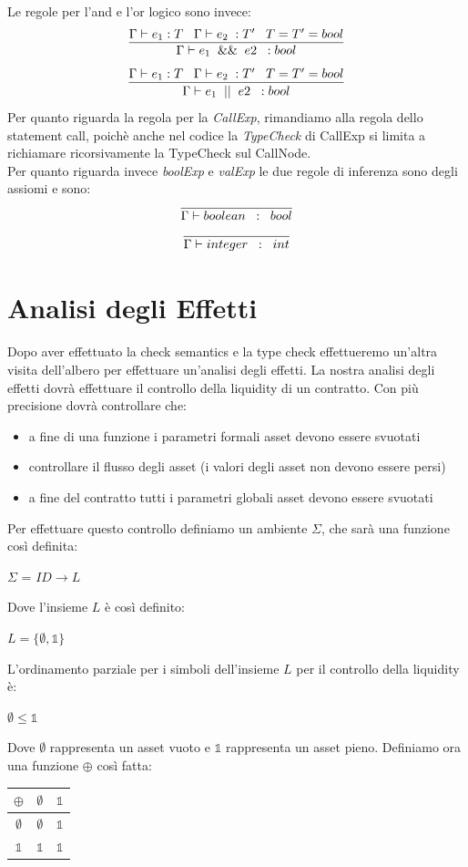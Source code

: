 \documentclass[12pt, a4paper]{report}
\begin{document}
Le regole per l'and e l'or logico sono invece:
\[ \infer{\Gamma \vdash e_1\;\; \&\&\;\; e2 \;\; : bool}{\Gamma \vdash e_1 :T \;\;\; \Gamma \vdash e_2 \; : T' \;\;\; T=T'=bool} \]
\[ \infer{\Gamma \vdash e_1 \;\; ||\;\; e2 \;\; : bool}{\Gamma \vdash e_1 :T \;\;\; \Gamma \vdash e_2 \; : T' \;\;\; T=T'=bool} \]
Per quanto riguarda la regola per la \emph{CallExp}, rimandiamo alla regola dello statement call, poichè anche nel codice la \emph{TypeCheck} di CallExp si limita a richiamare ricorsivamente la TypeCheck sul CallNode.\\
Per quanto riguarda invece \emph{boolExp} e \emph{valExp} le due regole di inferenza sono degli assiomi e sono:
\[ \infer{\Gamma \vdash boolean \;\; : \;\; bool}{} \]
\[ \infer{\Gamma \vdash integer \;\; : \;\; int}{} \]
\chapter{Analisi degli Effetti}
Dopo aver effettuato la check semantics e la type check effettueremo un'altra visita dell'albero per effettuare un'analisi degli effetti. La nostra analisi degli effetti dovrà effettuare il controllo della liquidity di un contratto. Con più precisione dovrà controllare che:
\begin{itemize}
    \item a fine di una funzione i parametri formali asset devono essere svuotati
    \item controllare il flusso degli asset (i valori degli asset non devono essere persi)
    \item a fine del contratto tutti i parametri globali asset devono essere svuotati 
\end{itemize}
Per effettuare questo controllo definiamo un ambiente $\Sigma$, che sarà una funzione così definita:
\begin{center}
    $\Sigma$ = $ID \rightarrow L$
\end{center}
Dove l'insieme $L$ è così definito:
\begin{center}
    $L = \{\emptyset, \mathds{1}\}$
\end{center}
L'ordinamento parziale per i simboli dell'insieme $L$ per il controllo della liquidity è: 
\begin{center}
    $ \emptyset \leq  \mathds{1}$
\end{center} 
Dove $\emptyset$ rappresenta un asset vuoto e $ \mathds{1}$ rappresenta un asset pieno. 
Definiamo ora una funzione $\oplus$ così fatta:\\
\begin{center}
    \begin{tabular}{|c| c| c|}
        \hline
        $\oplus$ & $\emptyset$ & $\mathds{1}$ \\
        \hline
        $\emptyset$ & $\emptyset$ &$\mathds{1}$\\
        \hline
        $\mathds{1}$ & $\mathds{1}$ &$\mathds{1}$\\
        \hline
    \end{tabular}
\end{center}
\end{document}

